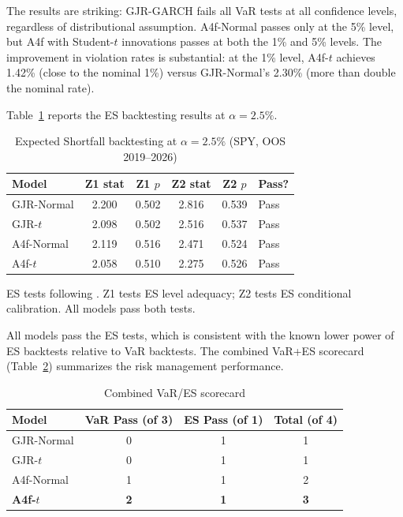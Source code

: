 \documentclass[12pt,a4paper]{article}
\begin{document}
The results are striking: GJR-GARCH fails all VaR tests at all confidence levels, regardless of distributional assumption. A4f-Normal passes only at the 5\% level, but A4f with Student-$t$ innovations passes at both the 1\% and 5\% levels. The improvement in violation rates is substantial: at the 1\% level, A4f-$t$ achieves 1.42\% (close to the nominal 1\%) versus GJR-Normal's 2.30\% (more than double the nominal rate).

Table~\ref{tab:es_results} reports the ES backtesting results at $\alpha = 2.5\%$.

\begin{table}[H]
\centering
\caption{Expected Shortfall backtesting at $\alpha = 2.5\%$ (SPY, OOS 2019--2026)}
\label{tab:es_results}
\begin{threeparttable}
\begin{tabular}{@{}lccccl@{}}
\toprule
Model & Z1 stat & Z1 $p$ & Z2 stat & Z2 $p$ & Pass? \\
\midrule
GJR-Normal & 2.200 & 0.502 & 2.816 & 0.539 & Pass \\
GJR-$t$ & 2.098 & 0.502 & 2.516 & 0.537 & Pass \\
A4f-Normal & 2.119 & 0.516 & 2.471 & 0.524 & Pass \\
A4f-$t$ & 2.058 & 0.510 & 2.275 & 0.526 & Pass \\
\bottomrule
\end{tabular}
\begin{tablenotes}
\footnotesize
\item ES tests following \citet{acerbi2019}. Z1 tests ES level adequacy; Z2 tests ES conditional calibration. All models pass both tests.
\end{tablenotes}
\end{threeparttable}
\end{table}

All models pass the ES tests, which is consistent with the known lower power of ES backtests relative to VaR backtests. The combined VaR+ES scorecard (Table~\ref{tab:scorecard}) summarizes the risk management performance.

\begin{table}[H]
\centering
\caption{Combined VaR/ES scorecard}
\label{tab:scorecard}
\begin{tabular}{@{}lccc@{}}
\toprule
Model & VaR Pass (of 3) & ES Pass (of 1) & Total (of 4) \\
\midrule
GJR-Normal & 0 & 1 & 1 \\
GJR-$t$ & 0 & 1 & 1 \\
A4f-Normal & 1 & 1 & 2 \\
\textbf{A4f-$t$} & \textbf{2} & \textbf{1} & \textbf{3} \\
\bottomrule
\end{tabular}
\end{table}
\end{document}
